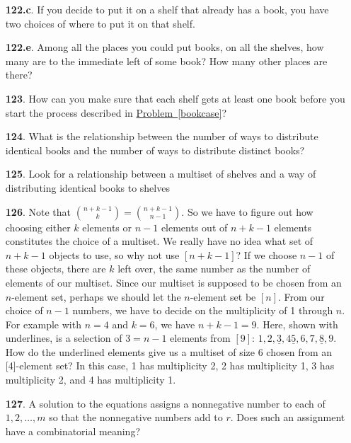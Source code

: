 \documentclass[10pt,]{book}
\theoremstyle{plain}
\theoremstyle{definition}
\theoremstyle{definition}
\numberwithin{equation}{chapter}
\begin{document}
\begin{itemize}[itemsep=1em]
\item[\textbf{122.c}.]If you decide to put it on a shelf that already has a book, you have two choices of where to put it on that shelf.%

\item[\textbf{122.e}.]Among all the places you could put books, on all the shelves, how many are to the immediate left of some book? How many other places are there?%

\item[\textbf{123}.]How can you make sure that each shelf gets at least one book before you start the process described in \hyperref[bookcase]{Problem~\ref{bookcase}}?%

\item[\textbf{124}.]What is the relationship between the number of ways to distribute identical books and the number of ways to distribute distinct books?%

\item[\textbf{125}.]Look for a relationship between a multiset of shelves and a way of distributing identical books to shelves%

\item[\textbf{126}.]Note that \(\binom{n+k-1}{k} = \binom{n+k-1}{n-1}\). So we have to figure out how choosing either \(k\) elements or \(n - 1\) elements out of \(n + k - 1\) elements constitutes the choice of a multiset. We really have no idea what set of \(n + k - 1\) objects to use, so why not use \([n + k - 1]\)? If we choose \(n - 1\) of these objects, there are \(k\) left over, the same number as the number of elements of our multiset. Since our multiset is supposed to be chosen from an \(n\)-element set, perhaps we should let the \(n\)-element set be \([n]\). From our choice of \(n - 1\) numbers, we have to decide on the multiplicity of 1 through \(n\). For example with \(n = 4\) and \(k = 6\), we have \(n+k-1=9\). Here, shown with underlines, is a selection of \(3=n-1\) elements from \([9]\): \(1, 2, \underline{3}, 4 \underline{5}, 6, 7, \underline{8}, 9\). How do the underlined elements give us a multiset of size 6 chosen from an [4]-element set? In this case, 1 has multiplicity 2, 2 has multiplicity 1, 3 has multiplicity 2, and 4 has multiplicity 1.%

\item[\textbf{127}.]A solution to the equations assigns a nonnegative number to each of \(1,2,\ldots, m\) so that the nonnegative numbers add to \(r\). Does such an assignment have a combinatorial meaning?%


\end{itemize}
\end{document}
